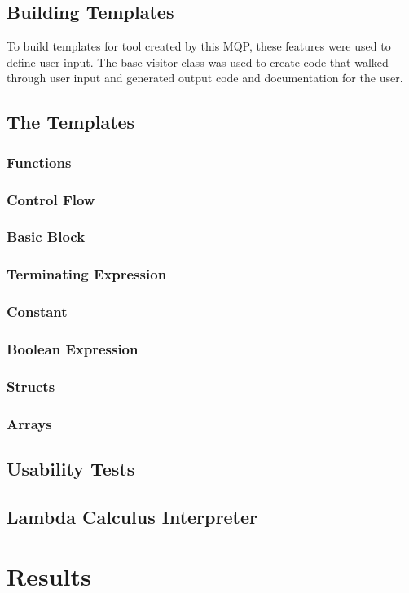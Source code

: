 \documentclass[hidelinks,12pt]{article}
\begin{document}
\begin{doublespacing}
\subsection{Building Templates}
To build templates for tool created by this MQP, these features were used to define user input. The base visitor class was used to create code that walked through user input and generated output code and documentation for the user.
\subsection{The Templates}
\subsubsection*{Functions}
\subsubsection*{Control Flow}
\subsubsection*{Basic Block}
\subsubsection*{Terminating Expression}
\subsubsection*{Constant}
\subsubsection*{Boolean Expression}
\subsubsection*{Structs}
\subsubsection*{Arrays}
\subsection{Usability Tests}
\subsection{Lambda Calculus Interpreter}

\section{Results}


\end{doublespacing}
\end{document}

